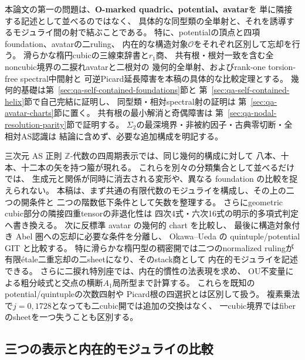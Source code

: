 \documentclass[a4paper,11pt]{ltjsarticle}
\numberwithin{equation}{section}
\theoremstyle{plain}
\theoremstyle{definition}
\theoremstyle{remark}
\newcommand{\OO}{\mathcal O}
\begin{document}
本論文の第一の問題は、\textbf{O-marked quadric、potential、avatar}を
単に隣接する記述として並べるのではなく、
具体的な同型類の全単射と、それを誘導するモジュライ間の射で結ぶことである。
特に、potentialの頂点と四項foundation、avatarの二ruling、
内在的な構造対象$\OO$をそれぞれ区別して忘却を行う。
滑らかな楕円cubicの三線束辞書と$r_1$商、
共有根・根対一致を含む全noncubic境界の二捩れavatarと二根対の
幾何的全単射、およびrank-one torsion-free spectral中間射と
可逆Picard延長障害を本稿の具体的な比較定理とする。
幾何的基礎は第~\ref{sec:qa-self-contained-foundations}節と
第~\ref{sec:qa-self-contained-helix}節で自己完結に証明し、
同型類・相対spectral射の証明は
第~\ref{sec:qa-avatar-charts}節に置く。
共有根の最小解消と奇偶障害は
第~\ref{sec:qa-nodal-resolution-parity}節で証明する。
$\Sigma_2$の最深境界・非被約因子・古典零切断・全相対AS認識は
結論に含めず、必要な追加構成を明記する。


三次元 AS 正則 $\mathbb Z$-代数の四周期表示では、同じ幾何的構成に対して
八本、十本、十二本の矢を持つ箙が現れる。
これらを別々の分類集合として並べるだけでは、
生成元と関係が同時に消去される変形や、異なる foundation の比較を捉えられない。
本稿は、まず共通の有限代数のモジュライを構成し、その上の二つの開条件と
二つの階数低下条件として矢数を整理する。
さらにgeometric cubic部分の隣接四重tensorの非退化性は
四次4式・六次16式の明示的多項式判定へ書き換える。
次に反標準 avatar の幾何的 chart を比較し、
最後に構造対象付き Abel 圏への忘却に必要な条件を分離し、
Okawa--Ueda の quintuple/potential GIT と比較する。
特に滑らかな楕円型の稠密開では二つのnormalized rulingが
有限étale二重忘却の二sheetになり、そのstack商として
内在的モジュライを記述できる。
さらに二捩れ特別座では、内在的慣性の法表現を求め、
OU不変量による粗分岐式と交点の横断$A_1$局所型まで計算する。
これらを既知のpotential/quintupleの次数四射や
Picard根の四選択とは区別して扱う。
複素乗法で$j=0,1728$となっても二cubic開では追加の交換はなく、
一cubic境界ではfiberのsheetを一つ失うことも区別する。

\subsection{三つの表示と内在的モジュライの比較}
\end{document}
